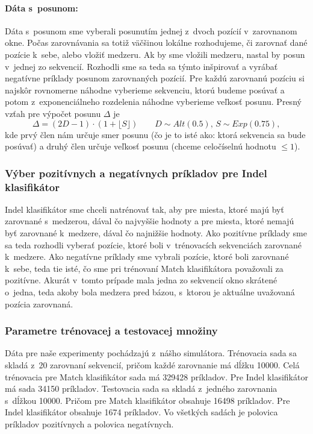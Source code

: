 \paragraph{Dáta s~posunom:} Dáta s~posunom sme vyberali posunutím jednej z~dvoch pozícií v~zarovnanom okne.
Počas zarovnávania sa totiž väčšinou lokálne rozhodujeme, či zarovnať dané pozície k~sebe, alebo vložiť medzeru. Ak by sme vložili medzeru, nastal by posun v~jednej zo sekvencií. Rozhodli sme sa teda sa týmto inšpirovať a vyrábať negatívne príklady posunom zarovnaných pozícií. Pre každú zarovnanú pozíciu si najskôr rovnomerne náhodne vyberieme sekvenciu, ktorú budeme posúvať a potom z~exponenciálneho rozdelenia náhodne vyberieme veľkosť posunu. Presný vzťah pre výpočet posunu $\Delta$ je
$$\Delta = \left(2D-1\right)\cdot \left(1+\lfloor S\rfloor\right)\qquad D\sim Alt(0.5),\, S\sim Exp(0.75),$$
kde prvý člen nám určuje smer posunu (čo je to isté ako: ktorá sekvencia sa bude posúvať) a druhý člen určuje veľkosť posunu (chceme celočíselnú hodnotu $\leq 1$).

\subsubsection{Výber pozitívnych a negatívnych príkladov pre Indel klasifikátor}

Indel klasifikátor sme chceli natrénovať tak, aby pre miesta, ktoré majú byť zarovnané s~medzerou, dával čo najvyššie hodnoty a pre miesta, ktoré nemajú byť zarovnané k~medzere, dával čo najnižšie hodnoty. Ako pozitívne príklady sme sa teda rozhodli vyberať pozície, ktoré boli v~trénovacích sekvenciách zarovnané k~medzere. Ako negatívne príklady sme vybrali pozície, ktoré boli zarovnané k~sebe, teda tie isté, čo sme pri trénovaní Match klasifikátora považovali za pozitívne. Akurát v~tomto prípade mala jedna zo sekvencií okno skrátené o~jedna, teda akoby bola medzera pred bázou, s~ktorou je aktuálne uvažovaná pozícia zarovnaná.

\subsubsection{Parametre trénovacej a testovacej množiny}
\label{subsec:clf-training-sets}
Dáta pre naše experimenty pochádzajú z~nášho simulátora. Trénovacia sada sa skladá z~20 zarovnaní sekvencií, pričom každé zarovnanie má dĺžku 10000. Celá trénovacia pre Match klasifikátor sada má 329428 príkladov. Pre Indel klasifikátor má sada 34150 príkladov.
Testovacia sada sa skladá z~jedného zarovnania s~dĺžkou 10000. Pričom pre Match klasifikátor obsahuje 16498 príkladov. Pre Indel klasifikátor obsahuje 1674 príkladov.
Vo všetkých sadách je polovica príkladov pozitívnych a polovica negatívnych.

